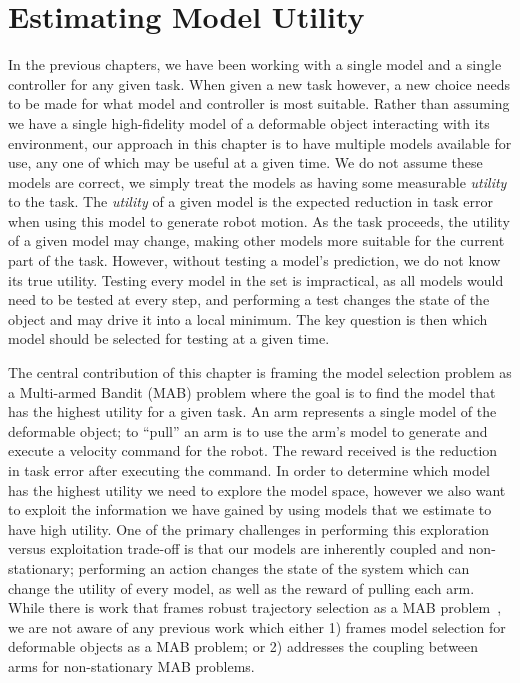 \chapter{Estimating Model Utility}

In the previous chapters, we have been working with a single model and a single controller for any given task. When given a new task however, a new choice needs to be made for what model and controller is most suitable. Rather than assuming we have a single high-fidelity model of a deformable object interacting with its environment, our approach in this chapter is to have multiple models available for use, any one of which may be useful at a given time. We do not assume these models are correct, we simply treat the models as having some measurable \textit{utility} to the task. The \textit{utility} of a given model is the expected reduction in task error when using this model to generate robot motion. As the task proceeds, the utility of a given model may change, making other models more suitable for the current part of the task. However, without testing a model's prediction, we do not know its true utility. Testing every model in the set is impractical, as all models would need to be tested at every step, and performing a test changes the state of the object and may drive it into a local minimum. The key question is then which model should be selected for testing at a given time.

The central contribution of this chapter is framing the model selection problem as a Multi-armed Bandit (MAB) problem where the goal is to find the model that has the highest utility for a given task. An arm represents a single model of the deformable object; to ``pull'' an arm is to use the arm's model to generate and execute a velocity command for the robot. The reward received is the reduction in task error after executing the command. In order to determine which model has the highest utility we need to explore the model space, however we also want to exploit the information we have gained by using models that we estimate to have high utility. One of the primary challenges in performing this exploration versus exploitation trade-off is that our models are inherently coupled and non-stationary; performing an action changes the state of the system which can change the utility of every model, as well as the reward of pulling each arm. While there is work that frames robust trajectory selection as a MAB problem~\cite{Koval2015}, we are not aware of any previous work which either 1) frames model selection for deformable objects as a MAB problem; or 2) addresses the coupling between arms for non-stationary MAB problems.

